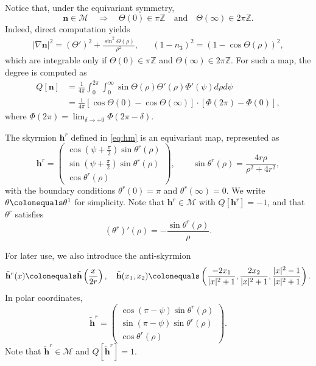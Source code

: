\documentclass{amsart}
\numberwithin{equation}{section}
\theoremstyle{definition}
\theoremstyle{remark}
\newcommand{\Z}{\mathbb{Z}}
\newcommand{\boM}{\mathcal{M}}
\newcommand{\te}{\ensuremath{\theta}}
\newcommand{\del}{{\delta}}								%
\newcommand{\nab}{{\nabla}}							%
\newcommand{\bh}{{\mathbf{h}}}
\newcommand{\bn}{{\mathbf{n}}}
\begin{document}
Notice that, under the equivariant symmetry,
$$
\bn\in \boM \quad \Longrightarrow \quad 
\Theta (0)\in \pi\Z \quad\text{and}\quad 
\Theta (\infty)\in 2\pi\Z.
$$
Indeed, direct computation yields
\begin{align*}
|\nab \bn|^2 = (\Theta')^2 + \frac{\sin^2 \Theta (\rho)}{\rho^2},&&
(1-n_3)^2 = (1-\cos \Theta (\rho))^2,
\end{align*}
which are integrable only if $\Theta (0)\in \pi\Z$ and $\Theta (\infty)\in 2\pi\Z$. 
For such a map, the degree is computed as
\begin{equation}\label{eq:Q}
\begin{aligned}
Q[\bn] 
&= \frac 1{4\pi} 
\int_0^{2\pi} \int_0^\infty \sin \Theta (\rho) \Theta'(\rho) \Phi'(\psi) d\rho d\psi \\
&= \frac 1{4\pi} [\cos \Theta(0) - \cos \Theta(\infty)] \cdot [\Phi(2\pi)- \Phi(0)],
\end{aligned}
\end{equation}
where $\Phi(2\pi) = \lim_{\del\to+0} \Phi(2\pi-\del)$.

The skyrmion $\bh^r$ defined in \eqref{eq:hm} is an equivariant map, represented as
$$
\bh^r =
\begin{pmatrix}
\cos (\psi+\frac \pi2) \sin \te^r(\rho)\\
\sin (\psi+\frac \pi2) \sin \te^r (\rho)\\
\cos \te^r(\rho)
\end{pmatrix}
,\qquad 
\sin \te^r (\rho) = \frac{4r\rho}{\rho^2+4r^2},
$$
with the boundary conditions $\te^r(0)=\pi$ and $\te^r(\infty)=0$. 
We write $\te\colonequals\te^1$ for 
simplicity. 
Note that $\bh^r\in \boM$ with $Q[\bh^r]=-1$, and that 
$\te^r$ satisfies 
$$
(\te^r)'(\rho) = -\frac{\sin \te^r(\rho)}{\rho}.
$$

For later use, we also introduce the anti-skyrmion \[
\tilde\bh^r(x)\colonequals\tilde\bh\left(\frac{x}{2r}\right), \quad
\tilde\bh(x_1,x_2) \colonequals
\left(
\frac{-2x_1}{|x|^2 + 1} , \frac{2x_2}{|x|^2 +1} ,  \frac{|x|^2-1}{|x|^2+1}
\right).
\]
In polar coordinates,
\begin{equation}\label{eq:defanti}
\tilde\bh^r = 
\begin{pmatrix}
\cos (\pi-\psi) \sin \te^r(\rho)\\
\sin (\pi -\psi) \sin \te^r (\rho)\\
\cos \te^r(\rho)
\end{pmatrix}
.
\end{equation}
Note that $\tilde\bh^r\in \boM$ and $Q[\tilde\bh^{r}]=1$.
\end{document}

